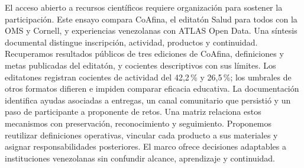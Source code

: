 El acceso abierto a recursos científicos requiere organización para sostener la participación. Este ensayo compara CoAfina, el editatón Salud para todos con la OMS y Cornell, y experiencias venezolanas con ATLAS Open Data. Una síntesis documental distingue inscripción, actividad, productos y continuidad. Recuperamos resultados públicos de tres ediciones de CoAfina, definiciones y metas publicadas del editatón, y cocientes descriptivos con sus límites. Los editatones registran cocientes de actividad del 42,2\,\% y 26,5\,\%; los umbrales de otros formatos difieren e impiden comparar eficacia educativa. La documentación identifica ayudas asociadas a entregas, un canal comunitario que persistió y un paso de participante a proponente de retos. Una matriz relaciona estos mecanismos con preservación, reconocimiento y seguimiento. Proponemos reutilizar definiciones operativas, vincular cada producto a sus materiales y asignar responsabilidades posteriores. El marco ofrece decisiones adaptables a instituciones venezolanas sin confundir alcance, aprendizaje y continuidad.
